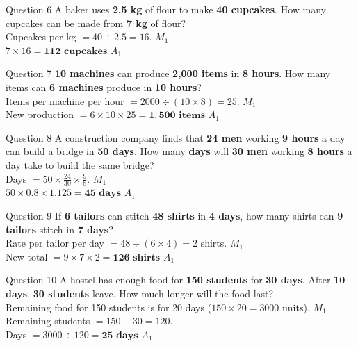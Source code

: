 \documentclass[12pt, a4paper, oneside]{article}
\begin{document}
\begin{solvingbox}{Question 6}
A baker uses \textbf{2.5 kg} of flour to make \textbf{40 cupcakes}. How many cupcakes can be made from \textbf{7 kg} of flour? \\
Cupcakes per kg $= 40 \div 2.5 = 16$. \hfill $M_1$ \\
$7 \times 16 = \mathbf{112\text{ cupcakes}}$ \hfill $A_1$
\end{solvingbox}

\begin{solvingbox}{Question 7}
\textbf{10 machines} can produce \textbf{2,000 items} in \textbf{8 hours}. How many items can \textbf{6 machines} produce in \textbf{10 hours}? \\
Items per machine per hour $= 2000 \div (10 \times 8) = 25$. \hfill $M_1$ \\
New production $= 6 \times 10 \times 25 = \mathbf{1,500\text{ items}}$ \hfill $A_1$
\end{solvingbox}

\begin{solvingbox}{Question 8}
A construction company finds that \textbf{24 men} working \textbf{9 hours} a day can build a bridge in \textbf{50 days}. How many \textbf{days} will \textbf{30 men} working \textbf{8 hours} a day take to build the same bridge? \\
Days $= 50 \times \frac{24}{30} \times \frac{9}{8}$. \hfill $M_1$ \\
$50 \times 0.8 \times 1.125 = \mathbf{45\text{ days}}$ \hfill $A_1$
\end{solvingbox}

\begin{solvingbox}{Question 9}
If \textbf{6 tailors} can stitch \textbf{48 shirts} in \textbf{4 days}, how many shirts can \textbf{9 tailors} stitch in \textbf{7 days}? \\
Rate per tailor per day $= 48 \div (6 \times 4) = 2$ shirts. \hfill $M_1$ \\
New total $= 9 \times 7 \times 2 = \mathbf{126\text{ shirts}}$ \hfill $A_1$
\end{solvingbox}

\begin{solvingbox}{Question 10}
A hostel has enough food for \textbf{150 students} for \textbf{30 days}. After \textbf{10 days}, \textbf{30 students} leave. How much longer will the food last? \\
Remaining food for 150 students is for 20 days ($150 \times 20 = 3000$ units). \hfill $M_1$ \\
Remaining students $= 150 - 30 = 120$. \\
Days $= 3000 \div 120 = \mathbf{25\text{ days}}$ \hfill $A_1$
\end{solvingbox}
\end{document}
